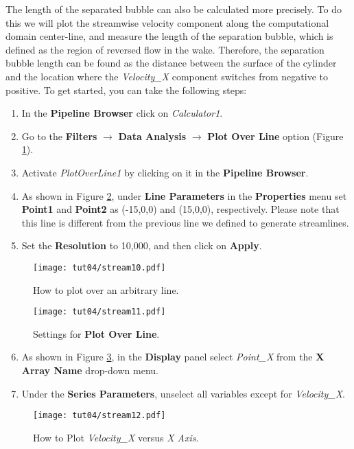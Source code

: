 The length of the separated bubble can also be calculated more precisely. To do this we will plot the streamwise velocity component along the computational domain center-line, and measure the length of the separation bubble, which is defined as the region of reversed flow in the wake. Therefore, the separation bubble length can be found as the distance between the surface of the cylinder and the location where the \textit{Velocity\_X} component switches from negative to positive. To get started, you can take the following steps: 
\begin{enumerate}[label=\arabic*)]
	\setcounter{enumi}{0}
	\item In the \textbf{Pipeline Browser} click on \textit{Calculator1}.
	\item Go to the \textbf{Filters} $\rightarrow$ \textbf{Data Analysis} $\rightarrow$ \textbf{Plot Over Line} option (Figure \ref{fig4:stream10_4}).
	\item Activate \textit{PlotOverLine1} by clicking on it in the \textbf{Pipeline Browser}.
	\item As shown in Figure \ref{fig4:stream11_4}, under \textbf{Line Parameters} in the \textbf{Properties} menu set \textbf{Point1} and \textbf{Point2} as (-15,0,0) and (15,0,0), respectively. Please note that this line is different from the previous line we defined to generate streamlines.
	\item Set the \textbf{Resolution} to 10,000, and then click on \textbf{Apply}.	
\end{enumerate}
\begin{figure}[ht]
    \centering
    \texttt{[image: tut04/stream10.pdf]}
    \caption{How to plot over an arbitrary line.}
    \label{fig4:stream10_4}
\end{figure}
\begin{figure}[H]
    \centering
    \texttt{[image: tut04/stream11.pdf]}
    \caption{Settings for \textbf{Plot Over Line}.}
    \label{fig4:stream11_4}
\end{figure}
\begin{enumerate}[label=\arabic*)]
	\setcounter{enumi}{5}
	\item As shown in Figure \ref{fig4:stream12_4}, in the \textbf{Display} panel select \textit{Point\_X} from the \textbf{X Array Name} drop-down menu.
	\item Under the \textbf{Series Parameters}, unselect all variables except for \textit{Velocity\_X}.	
\end{enumerate}
\begin{figure}[ht]
    \centering
    \texttt{[image: tut04/stream12.pdf]}
    \caption{How to Plot \textit{Velocity\_X} versus \textit{X Axis}.}
    \label{fig4:stream12_4}
\end{figure}

